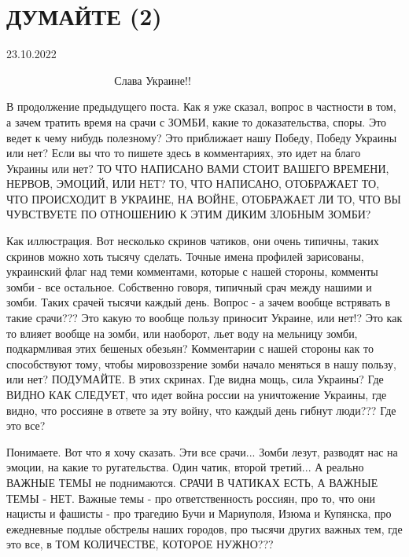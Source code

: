  
 
 
 
 

\section{ДУМАЙТЕ (2)}

23.10.2022

💛 💙 💛 💙 💛 💙 💛 💙 💛 💙 💛 💙 💛 💙 💛 💙                
Слава Украине!! 

В продолжение предыдущего поста. Как я уже сказал, вопрос в частности в том, а
зачем тратить время на срачи с ЗОМБИ, какие то доказательства, споры. Это ведет
к чему нибудь полезному? Это приближает нашу Победу, Победу Украины или нет?
Если вы что то пишете здесь в комментариях, это идет на благо Украины или нет?
ТО ЧТО НАПИСАНО ВАМИ СТОИТ ВАШЕГО ВРЕМЕНИ, НЕРВОВ, ЭМОЦИЙ, ИЛИ НЕТ? ТО, ЧТО
НАПИСАНО, ОТОБРАЖАЕТ ТО, ЧТО ПРОИСХОДИТ В УКРАИНЕ, НА ВОЙНЕ, ОТОБРАЖАЕТ ЛИ ТО,
ЧТО ВЫ ЧУВСТВУЕТЕ ПО ОТНОШЕНИЮ К ЭТИМ ДИКИМ ЗЛОБНЫМ ЗОМБИ?

Как иллюстрация. Вот несколько скринов чатиков, они очень типичны, таких
скринов можно хоть тысячу сделать. Точные имена профилей зарисованы, украинский
флаг над теми комментами, которые с нашей стороны, комменты зомби - все
остальное. Собственно говоря, типичный срач между нашими и зомби. Таких срачей
тысячи каждый день. Вопрос - а зачем вообще встрявать в такие срачи??? Это
какую то вообще пользу приносит Украине, или нет!? Это как то влияет вообще на
зомби, или наоборот, льет воду на мельницу зомби, подкармливая этих бешеных
обезьян? Комментарии с нашей стороны как то способствуют тому, чтобы
мировоззрение зомби начало меняться в нашу пользу, или нет? ПОДУМАЙТЕ. В этих
скринах. Где видна мощь, сила Украины? Где ВИДНО КАК СЛЕДУЕТ, что идет война
россии на уничтожение Украины, где видно, что россияне в ответе за эту войну,
что каждый день гибнут люди??? Где это все? 

Понимаете. Вот что я хочу сказать. Эти все срачи... Зомби лезут, разводят нас
на эмоции, на какие то ругательства. Один чатик, второй третий... А реально
ВАЖНЫЕ ТЕМЫ не поднимаются. СРАЧИ В ЧАТИКАХ ЕСТЬ, А ВАЖНЫЕ ТЕМЫ - НЕТ. Важные
темы - про ответственность россиян, про то, что они нацисты и фашисты - про
трагедию Бучи и Мариуполя, Изюма и Купянска, про ежедневные подлые обстрелы
наших городов, про тысячи других важных тем, где это все, в ТОМ КОЛИЧЕСТВЕ,
КОТОРОЕ НУЖНО??? 

